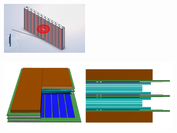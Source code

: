 \documentclass[bachelor,openany,oneside,color]{buaathesis}
\begin{document}
\begin{figure}
	\centering
	\begin{subfigure}{0.3\textwidth}
		\includegraphics[width=\textwidth]{./resource/CEE-eTOF.png}
		\label{fig:det:TOF:eTOF}
	\end{subfigure}
	\begin{subfigure}{0.5\textwidth}
		\includegraphics[width=\textwidth]{./resource/CEE-MRPC.png}
		\label{fig:det:TOF:MRPC}
	\end{subfigure}
	\begin{subfigure}{0.5\textwidth}

\end{subfigure}
\end{figure}
\end{document}
